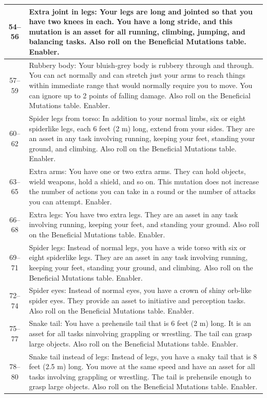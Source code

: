 \begin{longtable}{| c | p{15cm} |}
54–56 & Extra joint in legs: Your legs are long and jointed so that you have two knees in each. You have a long stride, and this mutation is an asset for all running, climbing, jumping, and balancing tasks. Also roll on the Beneficial Mutations table. Enabler. \\ \hline
57–59 & Rubbery body: Your bluish‑grey body is rubbery through and through. You can act normally and can stretch just your arms to reach things within immediate range that would normally require you to move. You can ignore up to 2 points of falling damage. Also roll on the Beneficial Mutations table. Enabler. \\ \hline
60–62 & Spider legs from torso: In addition to your normal limbs, six or eight spiderlike legs, each 6 feet (2 m) long, extend from your sides. They are an asset in any task involving running, keeping your feet, standing your ground, and climbing. Also roll on the Beneficial Mutations table. Enabler. \\ \hline
63–65 & Extra arms: You have one or two extra arms. They can hold objects, wield weapons, hold a shield, and so on. This mutation does not increase the number of actions you can take in a round or the number of attacks you can attempt. Enabler. \\ \hline
66–68 & Extra legs: You have two extra legs. They are an asset in any task involving running, keeping your feet, and standing your ground. Also roll on the Beneficial Mutations table. Enabler. \\ \hline
69–71 & Spider legs: Instead of normal legs, you have a wide torso with six or eight spiderlike legs. They are an asset in any task involving running, keeping your feet, standing your ground, and climbing. Also roll on the Beneficial Mutations table. Enabler. \\ \hline
72–74 & Spider eyes: Instead of normal eyes, you have a crown of shiny orb‑like spider eyes. They provide an asset to initiative and perception tasks. Also roll on the Beneficial Mutations table. Enabler. \\ \hline
75–77 & Snake tail: You have a prehensile tail that is 6 feet (2 m) long. It is an asset for all tasks ninvolving grappling or wrestling. The tail can grasp large objects. Also roll on the Beneficial Mutations table. Enabler. \\ \hline
78–80 & Snake tail instead of legs: Instead of legs, you have a snaky tail that is 8 feet (2.5 m) long. You move at the same speed and have an asset for all tasks involving grappling or wrestling. The tail is prehensile enough to grasp large objects. Also roll on the Beneficial Mutations table. Enabler. \\ \hline

\end{longtable}
